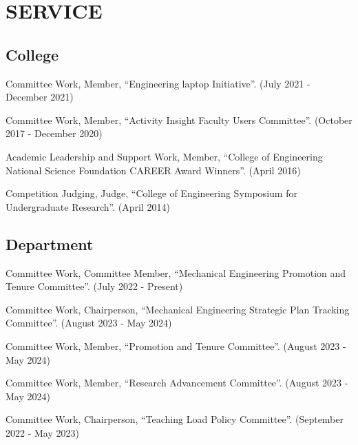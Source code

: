 \documentclass[a4paper,10pt]{article}
\begin{document}
    \section*{SERVICE}
    \subsection*{College}
    
        \noindent Committee Work, Member, ``Engineering laptop Initiative''. (July 2021 - December 2021)\vspace{0.25cm}
        
        \noindent Committee Work, Member, ``Activity Insight Faculty Users Committee''. (October 2017 - December 2020)\vspace{0.25cm}
        
        \noindent Academic Leadership and Support Work, Member, ``College of Engineering National Science Foundation CAREER Award Winners''. (April 2016)\vspace{0.25cm}
        
        \noindent Competition Judging, Judge, ``College of Engineering Symposium for Undergraduate Research''. (April 2014)\vspace{0.25cm}
        
    \subsection*{Department}
    
        \noindent Committee Work, Committee Member, ``Mechanical Engineering Promotion and Tenure Committee''. (July 2022 - Present)\vspace{0.25cm}
        
        \noindent Committee Work, Chairperson, ``Mechanical Engineering Strategic Plan Tracking Committee''. (August 2023 - May 2024)\vspace{0.25cm}
        
        \noindent Committee Work, Member, ``Promotion and Tenure Committee''. (August 2023 - May 2024)\vspace{0.25cm}
        
        \noindent Committee Work, Member, ``Research Advancement Committee''. (August 2023 - May 2024)\vspace{0.25cm}
        
        \noindent Committee Work, Chairperson, ``Teaching Load Policy Committee''. (September 2022 - May 2023)\vspace{0.25cm}
        
\end{document}
